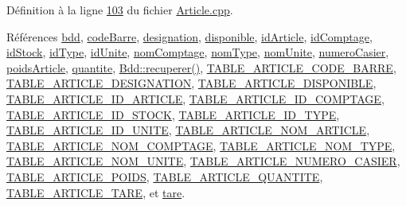 Définition à la ligne \hyperlink{_article_8cpp_source_l00103}{103} du fichier \hyperlink{_article_8cpp_source}{Article.\+cpp}.



Références \hyperlink{_article_8h_source_l00082}{bdd}, \hyperlink{_article_8h_source_l00090}{code\+Barre}, \hyperlink{_article_8h_source_l00091}{designation}, \hyperlink{_article_8h_source_l00093}{disponible}, \hyperlink{_article_8h_source_l00084}{id\+Article}, \hyperlink{_article_8h_source_l00088}{id\+Comptage}, \hyperlink{_article_8h_source_l00083}{id\+Stock}, \hyperlink{_article_8h_source_l00086}{id\+Type}, \hyperlink{_article_8h_source_l00096}{id\+Unite}, \hyperlink{_article_8h_source_l00089}{nom\+Comptage}, \hyperlink{_article_8h_source_l00087}{nom\+Type}, \hyperlink{_article_8h_source_l00097}{nom\+Unite}, \hyperlink{_article_8h_source_l00098}{numero\+Casier}, \hyperlink{_article_8h_source_l00094}{poids\+Article}, \hyperlink{_article_8h_source_l00092}{quantite}, \hyperlink{_bdd_8cpp_source_l00187}{Bdd\+::recuperer()}, \hyperlink{_article_8h_source_l00038}{T\+A\+B\+L\+E\+\_\+\+A\+R\+T\+I\+C\+L\+E\+\_\+\+C\+O\+D\+E\+\_\+\+B\+A\+R\+RE}, \hyperlink{_article_8h_source_l00039}{T\+A\+B\+L\+E\+\_\+\+A\+R\+T\+I\+C\+L\+E\+\_\+\+D\+E\+S\+I\+G\+N\+A\+T\+I\+ON}, \hyperlink{_article_8h_source_l00041}{T\+A\+B\+L\+E\+\_\+\+A\+R\+T\+I\+C\+L\+E\+\_\+\+D\+I\+S\+P\+O\+N\+I\+B\+LE}, \hyperlink{_article_8h_source_l00032}{T\+A\+B\+L\+E\+\_\+\+A\+R\+T\+I\+C\+L\+E\+\_\+\+I\+D\+\_\+\+A\+R\+T\+I\+C\+LE}, \hyperlink{_article_8h_source_l00036}{T\+A\+B\+L\+E\+\_\+\+A\+R\+T\+I\+C\+L\+E\+\_\+\+I\+D\+\_\+\+C\+O\+M\+P\+T\+A\+GE}, \hyperlink{_article_8h_source_l00031}{T\+A\+B\+L\+E\+\_\+\+A\+R\+T\+I\+C\+L\+E\+\_\+\+I\+D\+\_\+\+S\+T\+O\+CK}, \hyperlink{_article_8h_source_l00034}{T\+A\+B\+L\+E\+\_\+\+A\+R\+T\+I\+C\+L\+E\+\_\+\+I\+D\+\_\+\+T\+Y\+PE}, \hyperlink{_article_8h_source_l00044}{T\+A\+B\+L\+E\+\_\+\+A\+R\+T\+I\+C\+L\+E\+\_\+\+I\+D\+\_\+\+U\+N\+I\+TE}, \hyperlink{_article_8h_source_l00033}{T\+A\+B\+L\+E\+\_\+\+A\+R\+T\+I\+C\+L\+E\+\_\+\+N\+O\+M\+\_\+\+A\+R\+T\+I\+C\+LE}, \hyperlink{_article_8h_source_l00037}{T\+A\+B\+L\+E\+\_\+\+A\+R\+T\+I\+C\+L\+E\+\_\+\+N\+O\+M\+\_\+\+C\+O\+M\+P\+T\+A\+GE}, \hyperlink{_article_8h_source_l00035}{T\+A\+B\+L\+E\+\_\+\+A\+R\+T\+I\+C\+L\+E\+\_\+\+N\+O\+M\+\_\+\+T\+Y\+PE}, \hyperlink{_article_8h_source_l00045}{T\+A\+B\+L\+E\+\_\+\+A\+R\+T\+I\+C\+L\+E\+\_\+\+N\+O\+M\+\_\+\+U\+N\+I\+TE}, \hyperlink{_article_8h_source_l00046}{T\+A\+B\+L\+E\+\_\+\+A\+R\+T\+I\+C\+L\+E\+\_\+\+N\+U\+M\+E\+R\+O\+\_\+\+C\+A\+S\+I\+ER}, \hyperlink{_article_8h_source_l00042}{T\+A\+B\+L\+E\+\_\+\+A\+R\+T\+I\+C\+L\+E\+\_\+\+P\+O\+I\+DS}, \hyperlink{_article_8h_source_l00040}{T\+A\+B\+L\+E\+\_\+\+A\+R\+T\+I\+C\+L\+E\+\_\+\+Q\+U\+A\+N\+T\+I\+TE}, \hyperlink{_article_8h_source_l00043}{T\+A\+B\+L\+E\+\_\+\+A\+R\+T\+I\+C\+L\+E\+\_\+\+T\+A\+RE}, et \hyperlink{_article_8h_source_l00095}{tare}.



